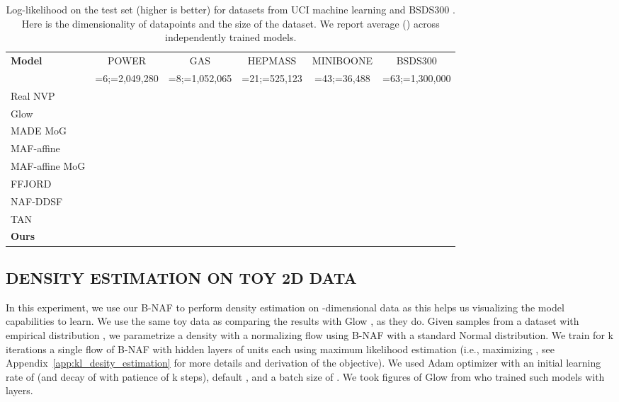 \documentclass[letterpaper]{article}
\begin{document}
\begin{table*}[t]
\centering
\caption{Log-likelihood on the test set (higher is better) for  datasets \citep{dua2017} from UCI machine learning and BSDS300 \citep{martin2001database}. Here  is the dimensionality of datapoints and  the size of the dataset. We report average () across  independently trained models. }
\begin{tabular}{lccccc}
\toprule
\multirow{2}{*}{\textbf{Model}} & POWER & GAS & HEPMASS & MINIBOONE & BSDS300 \\
 & {\tiny=6;=2,049,280 } &{\tiny =8;=1,052,065} &{\tiny =21;=525,123} &{\tiny=43;=36,488} & {\tiny=63;=1,300,000} \\
\midrule
Real NVP & {\tiny} & {\tiny} & {\tiny} & {\tiny} & {\tiny} \\
Glow & {\tiny} & {\tiny} & {\tiny} & {\tiny} & {\tiny} \\
MADE MoG & {\tiny} & {\tiny} & {\tiny} & {\tiny} & {\tiny} \\
MAF-affine & {\tiny} & {\tiny} & {\tiny} & {\tiny} & {\tiny} \\
MAF-affine MoG & {\tiny} & {\tiny} & {\tiny} & {\tiny} & {\tiny} \\
FFJORD & {\tiny} & {\tiny} & {\tiny} & {\tiny} & {\tiny} \\
NAF-DDSF & {\tiny} & {\tiny} & {\tiny} & {\tiny} & {\tiny} \\
TAN & {\tiny} & {\tiny} & {\tiny} & {\tiny} & {\tiny} \\
\midrule
\textbf{Ours} & {\tiny} & {\tiny} & {\tiny} & {\tiny} & {\tiny} \\
\bottomrule
\end{tabular}
\label{tab:density}
\end{table*}

\subsection{DENSITY ESTIMATION ON TOY 2D DATA} \label{sec:toy2d_mle}
In this experiment, we use our B-NAF to perform density estimation on -dimensional data as this helps us visualizing the model capabilities to learn. We use the same toy data as \citet{grathwohl2018ffjord} comparing the results with Glow \citep{kingma2018glow}, as they do. Given samples from a dataset with empirical distribution , we parametrize a density  with a normalizing flow  using B-NAF with  a standard Normal distribution. We train for k iterations a single flow of B-NAF with  hidden layers of  units each using maximum likelihood estimation (i.e., maximizing , see Appendix~\ref{app:kl_desity_estimation} for more details and derivation of the objective). We used Adam optimizer \citep{kingma2014adam} with an initial learning rate of  (and decay of  with patience of k steps), default , and a batch size of . We took figures of Glow from \citep{grathwohl2018ffjord} who trained such models with  layers.
\end{document}
